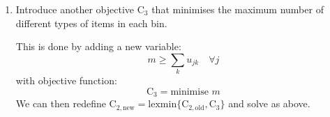 \documentclass[10pt,a4paper]{article}
\begin{document}
\begin{enumerate}
\item 
Introduce another objective \(\text{C}_3\) that minimises the maximum number of different types of items in each bin.

This is done by adding a new variable:
\begin{equation*}
	m \geq \sum_k u_{jk} \quad \forall j
\end{equation*}
with objective function:
\begin{equation*}
\text{C}_3 = \text{minimise } m
\end{equation*}
We can then redefine \(\text{C}_{2, \text{new}} = \text{lexmin}\{\text{C}_{2, \text{old}}, \text{C}_3\}\) and solve as above.
\end{enumerate}
\end{document}
